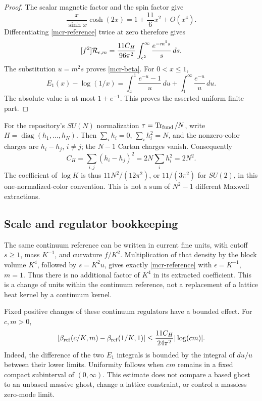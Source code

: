 \documentclass[11pt]{article}
\theoremstyle{remark}
\begin{document}
\begin{proof}
The scalar magnetic factor and the spin factor give
\[
 \frac{x}{\sinh x}\cosh(2x)
       =1+\frac{11}{6}x^2+O(x^4).
\]
Differentiating \eqref{mcr-reference} twice at zero
therefore gives
\[
 [f^2]{\cal R}_{\epsilon,m}
    =\frac{11C_H}{96\pi^2}
           \int_{\epsilon^2}^{\infty}\frac{e^{-m^2s}}s\,ds.
\]
The substitution \(u=m^2s\) proves \eqref{mcr-beta}.
For \(0<x\le1\),
\[
 E_1(x)-\log(1/x)
   =\int_x^1\frac{e^{-u}-1}{u}\,du
                  +\int_1^\infty\frac{e^{-u}}u\,du.
\]
The absolute value is at most \(1+e^{-1}\). This proves
the asserted uniform finite part.
\end{proof}

For the repository's \(SU(N)\) normalization
\(\tau=\operatorname{Tr}_{\rm fund}/N\), write
\(H=\operatorname{diag}(h_1,\ldots,h_N)\). Then
\(\sum_i h_i=0\), \(\sum_i h_i^2=N\), and the
nonzero-color charges are \(h_i-h_j\), \(i\ne j\);
the \(N-1\) Cartan charges vanish. Consequently
\[
 C_H=\sum_{i,j}(h_i-h_j)^2
              =2N\sum_i h_i^2=2N^2.
\]
The coefficient of \(\log K\) is thus
\(11N^2/(12\pi^2)\), or \(11/(3\pi^2)\) for \(SU(2)\),
in this one-normalized-color convention.
This is not a sum of \(N^2-1\) different Maxwell extractions.

\subsection{Scale and regulator bookkeeping}
\label{mcr-scaling-section}

The same continuum reference can be written in current
fine units, with cutoff \(s\ge1\), mass \(K^{-1}\), and
curvature \(f/K^2\). Multiplication of that density by
the block volume \(K^4\), followed by \(s=K^2u\), gives
exactly \eqref{mcr-reference} with \(\epsilon=K^{-1}\),
\(m=1\). Thus there is no additional factor of \(K^4\)
in its extracted coefficient. This is a change of units
within the continuum reference, not a replacement of a
lattice heat kernel by a continuum kernel.

Fixed positive changes of these continuum regulators
have a bounded effect. For \(c,m>0\),
\begin{equation}
 |\beta_{\rm ref}(c/K,m)-\beta_{\rm ref}(1/K,1)|
 \le\frac{11C_H}{24\pi^2}|\log(cm)|.
 \label{mcr-regulator-change}
\end{equation}
Indeed, the difference of the two \(E_1\) integrals is
bounded by the integral of \(du/u\) between their lower
limits. Uniformity follows when \(cm\) remains in a
fixed compact subinterval of \((0,\infty)\).
This estimate does not compare a based ghost to an
unbased massive ghost, change a lattice constraint, or
control a massless zero-mode limit.
\end{document}
